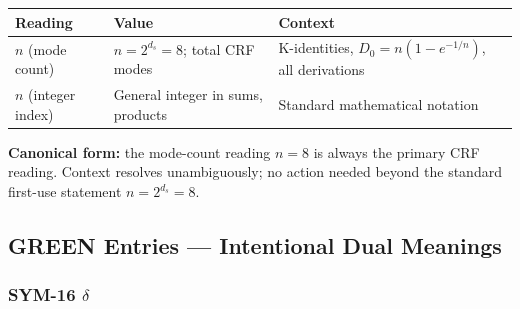 \documentclass[12pt, a4paper]{article}
\begin{document}
\begin{yellowbox}[title={SYM-15 \textmd{---} $n$ \textmd{(mode count vs integer index)}}]
\renewcommand{\arraystretch}{1.35}
\begin{tabular}{p{2.8cm} p{4.5cm} p{4.5cm}}
\toprule
\textbf{Reading} & \textbf{Value} & \textbf{Context}\\
\midrule
$n$ (mode count) &
  $n = 2^{d_s} = 8$; total CRF modes &
  K-identities, $D_0 = n(1-e^{-1/n})$, all derivations\\
$n$ (integer index) &
  General integer in sums, products &
  Standard mathematical notation\\
\bottomrule
\end{tabular}

\medskip
\textbf{Canonical form:} the mode-count reading $n = 8$ is always
the primary CRF reading. Context resolves unambiguously; no action
needed beyond the standard first-use statement $n = 2^{d_s} = 8$.
\end{yellowbox}

\subsection{GREEN Entries — Intentional Dual Meanings}

\subsubsection*{SYM-16 \quad $\delta$}
\end{document}
